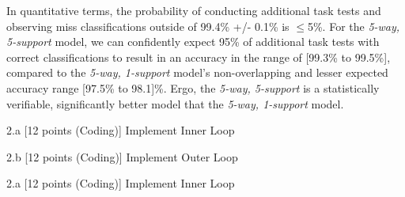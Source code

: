 \begin{answer}
    In quantitative terms, the probability of conducting additional task tests and observing miss classifications outside of 99.4\% +/- 0.1\% is $\leq$5\%. For the \textit{5-way, 5-support} model, we can confidently expect 95\% of additional task tests with correct classifications to result in an accuracy in the range of [99.3\% to 99.5\%], compared to the \textit{5-way, 1-support} model's non-overlapping and lesser expected accuracy range [97.5\% to 98.1]\%. Ergo, the \textit{5-way, 5-support} is a statistically verifiable, significantly better model that the \textit{5-way, 1-support} model.
    \\
    
\end{answer}


    

\clearpage

\LARGE
2.a [12 points (Coding)] Implement Inner Loop
\\
\normalsize

\LARGE
2.b [12 points (Coding)] Implement Outer Loop
\normalsize

\begin{answer}

    
\end{answer}

\clearpage


\clearpage

\LARGE
2.a [12 points (Coding)] Implement Inner Loop
\\
\normalsize



